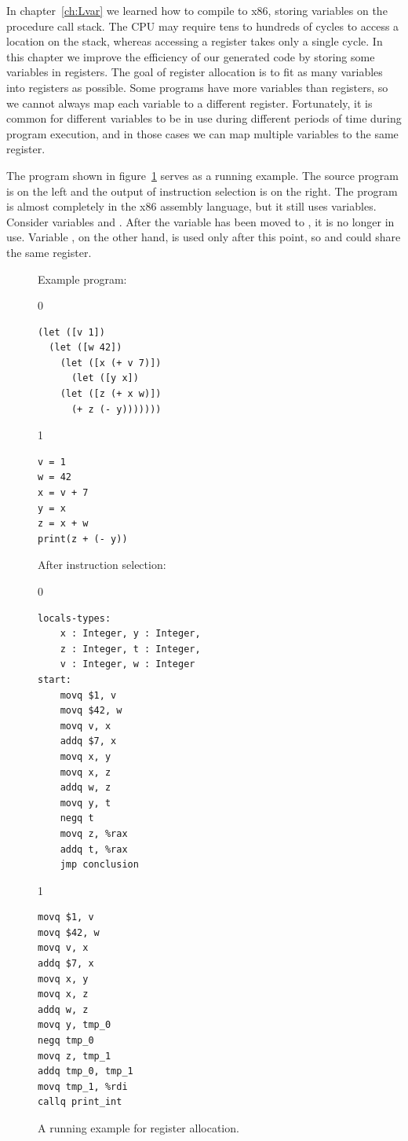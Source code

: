 \documentclass[7x10]{TimesAPriori_MIT}%
\def\racketEd{0}
\def\pythonEd{1}
\def\edition{0}
\numberwithin{theorem}{chapter}
\numberwithin{definition}{chapter}
\numberwithin{equation}{chapter}
\begin{document}

In chapter~\ref{ch:Lvar} we learned how to compile \LangVar{} to x86,
storing variables on the procedure call stack.  The CPU may require tens
to hundreds of cycles to access a location on the stack, whereas
accessing a register takes only a single cycle. In this chapter we
improve the efficiency of our generated code by storing some variables
in registers. The goal of register allocation is to fit as many
variables into registers as possible. Some programs have more
variables than registers, so we cannot always map each variable to a
different register. Fortunately, it is common for different variables
to be in use during different periods of time during program
execution, and in those cases we can map multiple variables to the
same register.

The program shown in figure~\ref{fig:reg-eg} serves as a running
example. The source program is on the left and the output of
instruction selection is on the right. The program is almost
completely in the x86 assembly language, but it still uses variables.
Consider variables  and .  After the variable 
has been moved to , it is no longer in use.  Variable , on
the other hand, is used only after this point, so  and
 could share the same register.

\begin{figure}
\begin{tcolorbox}[colback=white]
\begin{minipage}{0.45\textwidth}
Example \LangVar{} program:
{\if\edition\racketEd
\begin{lstlisting}
(let ([v 1])
  (let ([w 42])
    (let ([x (+ v 7)])
      (let ([y x])
	(let ([z (+ x w)])
	  (+ z (- y)))))))
\end{lstlisting}
\fi}
{\if\edition\pythonEd
\begin{lstlisting}
v = 1
w = 42
x = v + 7
y = x
z = x + w
print(z + (- y))
\end{lstlisting}
\fi}
\end{minipage}
\begin{minipage}{0.45\textwidth}
After instruction selection:
{\if\edition\racketEd
\begin{lstlisting}
locals-types:
    x : Integer, y : Integer,
    z : Integer, t : Integer,
    v : Integer, w : Integer
start:
    movq $1, v
    movq $42, w
    movq v, x
    addq $7, x
    movq x, y
    movq x, z
    addq w, z
    movq y, t
    negq t
    movq z, %rax
    addq t, %rax
    jmp conclusion
\end{lstlisting}
\fi}
{\if\edition\pythonEd
\begin{lstlisting}
movq $1, v
movq $42, w
movq v, x
addq $7, x
movq x, y
movq x, z
addq w, z
movq y, tmp_0
negq tmp_0
movq z, tmp_1
addq tmp_0, tmp_1
movq tmp_1, %rdi
callq print_int
\end{lstlisting}
\fi}
\end{minipage}
\end{tcolorbox}
\caption{A running example for register allocation.}
\label{fig:reg-eg}
\end{figure}
\end{document}
